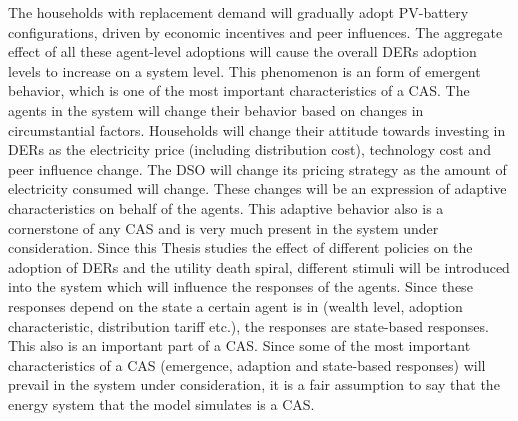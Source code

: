 The households with replacement demand will gradually adopt PV-battery configurations, driven by economic incentives and peer influences. The aggregate effect of all these agent-level adoptions will cause the overall DERs adoption levels to increase on a system level. This phenomenon is an form of emergent behavior, which is one of the most important characteristics of a CAS. The agents in the system will change their behavior based on changes in circumstantial factors. Households will change their attitude towards investing in DERs as the electricity price (including distribution cost), technology cost and peer influence change. The DSO will change its pricing strategy as the amount of electricity consumed will change. These changes will be an expression of adaptive characteristics on behalf of the agents. This adaptive behavior also is a cornerstone of any CAS and is very much present in the system under consideration. Since this Thesis studies the effect of different policies on the adoption of DERs and the utility death spiral, different stimuli will be introduced into the system which will influence the responses of the agents. Since these responses depend on the state a certain agent is in (wealth level, adoption characteristic, distribution tariff etc.), the responses are state-based responses. This also is an important part of a CAS.
\newline \newline \noindent
Since some of the most important characteristics of a CAS (emergence, adaption and state-based responses) will prevail in the system under consideration, it is a fair assumption to say that the energy system that the model simulates is a CAS. 
